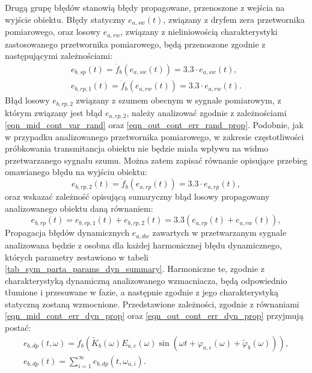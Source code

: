 Drugą grupę błędów stanowią błędy propagowane, przenoszone z wejścia na wyjście obiektu. Błędy statyczny $e_{a,sw}(t)$, związany z dryfem zera przetwornika pomiarowego, oraz losowy $e_{a,rw}$, związany z nieliniowością charakterystyki zastosowanego przetwornika pomiarowego, będą przenoszone zgodnie z następującymi zależnościami:
\begin{gather}
e_{b,sp} \left( t \right) = \dot{f}_{b} \left( e_{a,sw} \left( t \right) \right) = 3.3 \cdot e_{a,sw} \left( t \right) \label{eqn_sym_partb_stat_prop_err}, \\
e_{b,rp,1} \left( t \right) = \dot{f}_{b} \left( e_{a,rw} \left( t \right) \right) = 3.3 \cdot e_{a,rw} \left( t \right) \label{eqn_sym_partb_rand_prop_err_1}.
\end{gather}
Błąd losowy $e_{b,rp,2}$ związany z szumem obecnym w sygnale pomiarowym, z którym związany jest błąd $e_{a,rp,2}$, należy analizować zgodnie z zależnościami \eqref{eqn_mid_cont_var_rand} oraz \eqref{eqn_out_cont_err_rand_prop}. Podobnie, jak w przypadku analizowanego przetwornika pomiarowego, w zakresie częstotliwości próbkowania transmitancja obiektu nie będzie miała wpływu na widmo przetwarzanego sygnału szumu. Można zatem zapisać równanie opisujące przebieg omawianego błędu na wyjściu obiektu:
\begin{equation}
e_{b,rp,2} \left( t \right) = \dot{f}_{b} \left( e_{a,rp} \left( t \right) \right) = 3.3 \cdot e_{a,rp} \left( t \right) \label{eqn_sym_partb_rand_prop_err_2},
\end{equation}
oraz wskazać zależność opisującą sumaryczny błąd losowy propagowany analizowanego obiektu daną równaniem:
\begin{equation}
e_{b,rp} \left( t \right) = e_{b,rp,1} \left( t \right) + e_{b,rp,2} \left( t \right) = 3.3 \left( e_{a,rp} \left( t \right) + e_{a,rw} \left( t \right) \right) \label{eqn_sym_partb_rand_prop_err},
\end{equation}
Propagacja błędów dynamicznych $e_{a,dw}$ zawartych w przetwarzanym sygnale analizowana będzie z osobna dla każdej harmonicznej błędu dynamicznego, których parametry zestawiono w tabeli \ref{tab_sym_parta_params_dyn_summary}. Harmoniczne te, zgodnie z charakterystyką dynamiczną analizowanego wzmacniacza, będą odpowiednio tłumione i przesuwane w fazie, a następnie zgodnie z jego charakterystyką statyczną zostaną wzmocnione. Przedstawione zależności, zgodnie z równaniami \eqref{eqn_mid_cont_err_dyn_prop} oraz \eqref{eqn_out_cont_err_dyn_prop} przyjmują postać:
\begin{gather}
e_{b,dp} \left( t,\omega \right) = \dot{f}_{b} \left( \tilde{K}_{b} \left( \omega \right) E_{a,e} \left( \omega \right) \sin \left( \omega t + \varphi_{a,e} \left( \omega \right) + \tilde{\varphi}_{b} \left( \omega \right) \right) \right) \label{eqn_sym_partb_dyn_prop_err},\\
e_{b,dp} \left( t \right) = \sum _{i = 1} ^{\infty} e_{b,dp} \left( t,\omega_{a,i} \right) \label{eqn_sym_partb_dyn_prop_sum}.
\end{gather}

